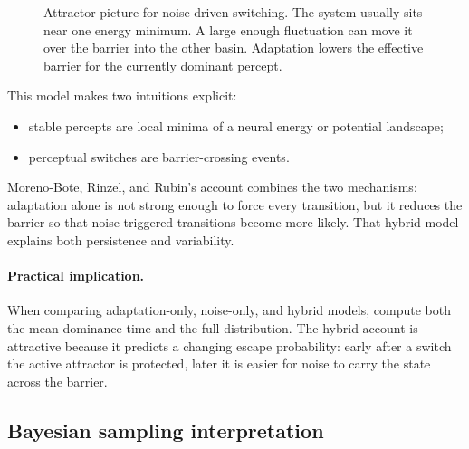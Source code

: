 \begin{figure}[!htbp]
\centering
{}
\caption{Attractor picture for noise-driven switching. The system usually sits near one energy minimum. A large enough fluctuation can move it over the barrier into the other basin. Adaptation lowers the effective barrier for the currently dominant percept.}
\end{figure}

This model makes two intuitions explicit:
\begin{itemize}
    \item stable percepts are local minima of a neural energy or potential landscape;
    \item perceptual switches are barrier-crossing events.
\end{itemize}

Moreno-Bote, Rinzel, and Rubin's account combines the two mechanisms: adaptation alone is not strong enough to force every transition, but it reduces the barrier so that noise-triggered transitions become more likely. That hybrid model explains both persistence and variability.

\paragraph{Practical implication.}
When comparing adaptation-only, noise-only, and hybrid models, compute both the mean dominance time and the full distribution. The hybrid account is attractive because it predicts a changing escape probability: early after a switch the active attractor is protected, later it is easier for noise to carry the state across the barrier.

\subsection{Bayesian sampling interpretation}

